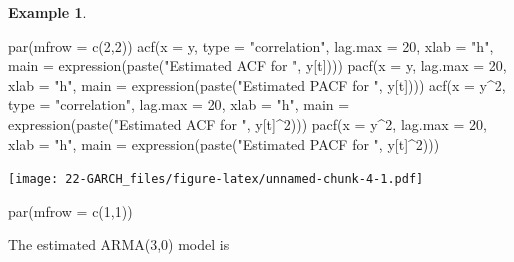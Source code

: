 \documentclass[
]{book}
\newenvironment{Shaded}{\begin{snugshade}}{\end{snugshade}}
\newcommand{\AttributeTok}[1]{\textcolor[rgb]{0.77,0.63,0.00}{#1}}
\newcommand{\DecValTok}[1]{\textcolor[rgb]{0.00,0.00,0.81}{#1}}
\newcommand{\FunctionTok}[1]{\textcolor[rgb]{0.00,0.00,0.00}{#1}}
\newcommand{\NormalTok}[1]{#1}
\newcommand{\SpecialCharTok}[1]{\textcolor[rgb]{0.00,0.00,0.00}{#1}}
\newcommand{\StringTok}[1]{\textcolor[rgb]{0.31,0.60,0.02}{#1}}
\theoremstyle{definition}
\theoremstyle{definition}
\newtheorem{example}{Example}[chapter]
\theoremstyle{definition}
\theoremstyle{definition}
\theoremstyle{remark}
\begin{document}
\begin{example}
\begin{Shaded}
\begin{Highlighting}[]
\FunctionTok{par}\NormalTok{(}\AttributeTok{mfrow =} \FunctionTok{c}\NormalTok{(}\DecValTok{2}\NormalTok{,}\DecValTok{2}\NormalTok{))}
\FunctionTok{acf}\NormalTok{(}\AttributeTok{x =}\NormalTok{ y, }\AttributeTok{type =} \StringTok{"correlation"}\NormalTok{, }\AttributeTok{lag.max =} \DecValTok{20}\NormalTok{, }\AttributeTok{xlab =} 
    \StringTok{"h"}\NormalTok{, }\AttributeTok{main =} \FunctionTok{expression}\NormalTok{(}\FunctionTok{paste}\NormalTok{(}\StringTok{"Estimated ACF for "}\NormalTok{, }
\NormalTok{    y[t])))}
\FunctionTok{pacf}\NormalTok{(}\AttributeTok{x =}\NormalTok{ y, }\AttributeTok{lag.max =} \DecValTok{20}\NormalTok{, }\AttributeTok{xlab =} \StringTok{"h"}\NormalTok{, }\AttributeTok{main =} 
    \FunctionTok{expression}\NormalTok{(}\FunctionTok{paste}\NormalTok{(}\StringTok{"Estimated PACF for "}\NormalTok{, y[t])))}
\FunctionTok{acf}\NormalTok{(}\AttributeTok{x =}\NormalTok{ y}\SpecialCharTok{\^{}}\DecValTok{2}\NormalTok{, }\AttributeTok{type =} \StringTok{"correlation"}\NormalTok{, }\AttributeTok{lag.max =} \DecValTok{20}\NormalTok{, }\AttributeTok{xlab =} 
    \StringTok{"h"}\NormalTok{, }\AttributeTok{main =} \FunctionTok{expression}\NormalTok{(}\FunctionTok{paste}\NormalTok{(}\StringTok{"Estimated ACF for "}\NormalTok{, }
\NormalTok{    y[t]}\SpecialCharTok{\^{}}\DecValTok{2}\NormalTok{)))}
\FunctionTok{pacf}\NormalTok{(}\AttributeTok{x =}\NormalTok{ y}\SpecialCharTok{\^{}}\DecValTok{2}\NormalTok{, }\AttributeTok{lag.max =} \DecValTok{20}\NormalTok{, }\AttributeTok{xlab =} \StringTok{"h"}\NormalTok{, }\AttributeTok{main =} 
    \FunctionTok{expression}\NormalTok{(}\FunctionTok{paste}\NormalTok{(}\StringTok{"Estimated PACF for "}\NormalTok{, y[t]}\SpecialCharTok{\^{}}\DecValTok{2}\NormalTok{)))}
\end{Highlighting}
\end{Shaded}

\texttt{[image: 22-GARCH\_files/figure-latex/unnamed-chunk-4-1.pdf]}

\begin{Shaded}
\begin{Highlighting}[]
\FunctionTok{par}\NormalTok{(}\AttributeTok{mfrow =} \FunctionTok{c}\NormalTok{(}\DecValTok{1}\NormalTok{,}\DecValTok{1}\NormalTok{))}
\end{Highlighting}
\end{Shaded}

The estimated ARMA(3,0) model is


\end{example}
\end{document}

